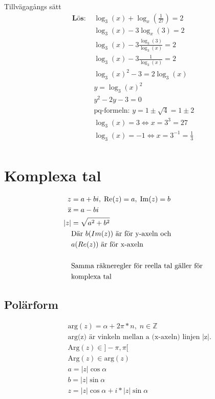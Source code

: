 \begin{multicols}{2}
\begin{exampleblock}{Tillvägagångs sätt}
\begin{align*}
  \textbf{Lös: } &\log_3(x) + \log_x(\frac{1}{27}) = 2 \\
  &\log_3(x) - 3 \log_x(3) = 2 \\
  &\log_3(x) - 3 \frac{\log_3(3)}{\log_3(x)} = 2 \\
  &\log_3(x) - 3 \frac{1}{\log_3(x)} = 2 \\
  &\log_3(x)^2 - 3 = 2 \log_3(x) \\
  &y = \log_3(x)^{2} \\
  &y^2 - 2y- 3 = 0 \\
  &\text{pq-formeln: } y= 1 \pm \sqrt{4} = 1 \pm 2 \\
  &\log_3(x) = 3 \Leftrightarrow x = 3^3 = 27 \\
  &\log_3(x) = -1 \Leftrightarrow x = 3^{-1} = \frac{1}{3} \\
\end{align*}
\end{exampleblock}


\section{Komplexa tal}
\begin{align*}
z &= a + bi,\; 
\operatorname{Re}(z) = a,\;
\operatorname{Im}(z) = b \\
\overline{\rm z} &= a - b i \\
|z| &= \sqrt{a^ { 2 } + b^ { 2 }} \\ 
&\text{Där $b(Im(z))$ är för y-axeln och} \\
&a(Re(z)) \text{ är för x-axeln} \\
& \\
&\text{Samma räkneregler för reella tal gäller för} \\
&\text{komplexa tal} \\
\end{align*}


\subsection{Polärform}
\begin{align*}
  &\quad \text{arg}(z) = \alpha + 2\pi * n,\; n\in\mathbb{Z} \\
  &\quad \text{arg(z) är vinkeln mellan a (x-axeln) linjen |z|.}  \\
  &\quad \text{Arg}(z) \in ]-\pi, \pi[ \\
    &\quad \text{Arg}(z) \in \text{arg}(z) \\
    &\quad a = |z| \cos{\alpha} \\
    &\quad b = |z| \sin{\alpha} \\
    &\quad z = |z| \cos{\alpha} + i * |z| \sin{\alpha} \\
\end{align*}


\end{multicols}
